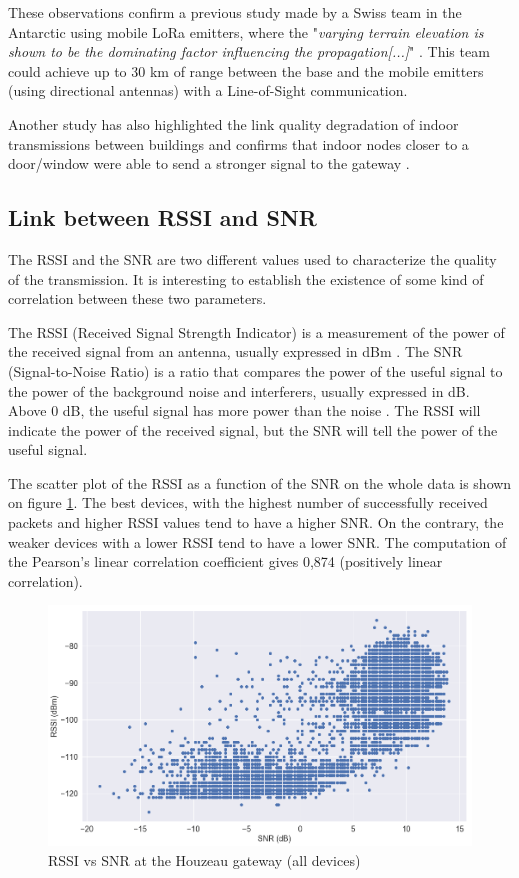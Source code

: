 \documentclass[letterpaper, 10 pt, conference]{ieeeconf}  %
\begin{document}
These observations confirm a previous study made by a Swiss team in the Antarctic using mobile LoRa emitters, where the "\textit{varying terrain elevation is shown to be
the dominating factor influencing the propagation[...]}" \cite{c14}. This team could achieve up to 30 km of range between the base and the mobile emitters (using directional antennas) with a Line-of-Sight communication.

Another study has also highlighted the link quality degradation of indoor transmissions between buildings and confirms that indoor nodes closer to a door/window were able to send a stronger signal to the gateway \cite{c12}.

\subsection{Link between RSSI and SNR}

The RSSI and the SNR are two different values used to characterize the quality of the transmission. It is interesting to establish the existence of some kind of correlation between these two parameters.

The RSSI (Received Signal Strength Indicator) is a measurement of the power of the received signal from an antenna, usually expressed in dBm \cite{c9} \cite{c10}. The SNR (Signal-to-Noise Ratio) is a ratio that compares the power of the useful signal to the power of the background noise and interferers, usually expressed in dB. Above 0 dB, the useful signal has more power than the noise \cite{c11}. The RSSI will indicate the power of the received signal, but the SNR will tell the power of the useful signal.

The scatter plot of the RSSI as a function of the SNR on the whole data is shown on figure \ref{rssi_snr_general}. The best devices, with the highest number of successfully received packets and higher RSSI values tend to have a higher SNR. On the contrary, the weaker devices with a lower RSSI tend to have a lower SNR. The computation of the Pearson's linear correlation coefficient gives 0,874 (positively linear correlation).

\begin{figure}[hb!]
\centering
\includegraphics[scale=0.33]{general_rssi_snr_behaviour.png}
\caption{RSSI vs SNR at the Houzeau gateway (all devices)}
\label{rssi_snr_general}
\end{figure}
\end{document}
